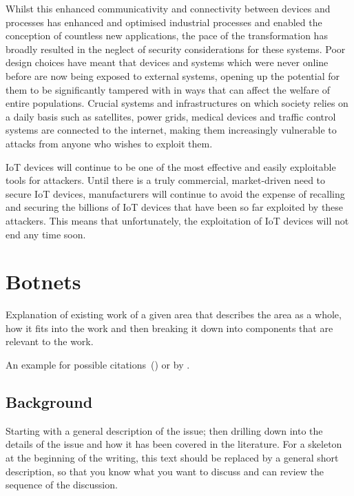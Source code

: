 Whilst this enhanced communicativity and connectivity between devices and processes has enhanced and optimised industrial processes and enabled the conception of countless new applications, the pace of the transformation has broadly resulted in the neglect of security considerations for these systems. Poor design choices have meant that devices and systems which were never online before are now being exposed to external systems, opening up the potential for them to be significantly tampered with in ways that can affect the welfare of entire populations.  Crucial systems and infrastructures on which society relies on a daily basis such as satellites, power grids, medical devices and traffic control systems are connected to the internet, making them increasingly vulnerable to attacks from anyone who wishes to exploit them.

IoT devices will continue to be one of the most effective and easily exploitable tools for attackers. Until there is a truly commercial, market-driven need to secure IoT devices, manufacturers will continue to avoid the expense of recalling and securing the billions of IoT devices that have been so far exploited by these attackers. This means that unfortunately, the exploitation of IoT devices will
not end any time soon.



\section{Botnets}

Explanation of existing work of a given area that describes the area as a whole, how it fits into the work and then breaking it down into components that are relevant to the work.

An example for possible citations~(\cite{Andrew2013empirical}) or by \cite{Asghari2015Economics}.

\subsection{Background}

Starting with a general description of the issue; then drilling down into the details of the issue and how it has been covered in the literature. For a skeleton at the beginning of the writing, this text should be replaced by a general short description, so that you know what you want to discuss and can review the sequence of the discussion.

